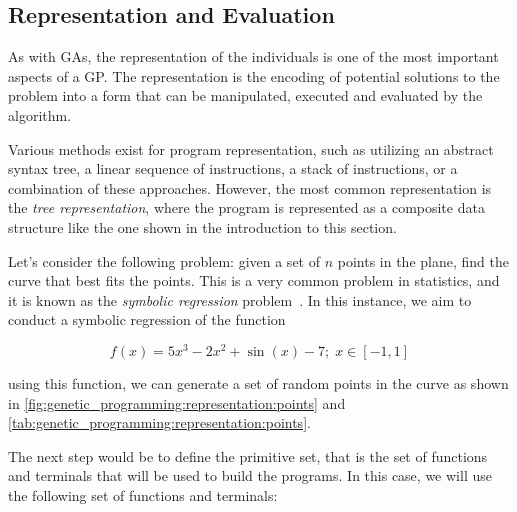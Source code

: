 \subsection{Representation and Evaluation}
\label{sec:genetic_programming:representation}
  As with GAs, the representation of the individuals is one of the most 
  important aspects of a GP.
  The representation is the encoding of potential solutions to the problem into
  a form that can be manipulated, executed and evaluated by the algorithm.

  Various methods exist for program representation, such as utilizing an abstract 
  syntax tree, a linear sequence of instructions, a stack of instructions, or a combination of these approaches.
  However, the most common representation is the \emph{tree representation}, where
  the program is represented as a composite data structure like the one shown in
  the introduction to this section.

  Let's consider the following problem: given a set of \(n\) points in the 
  plane, find the curve that best fits the points.
  This is a very common problem in statistics, and it is known as the
  \emph{symbolic regression} 
  problem~\autocite{kozaGeneticProgrammingProgramming1992a}.
  In this instance, we aim to conduct a symbolic regression of the function

  \begin{equation}
    f(x) = 5x^3 - 2x^2 + \sin(x) - 7;\; x \in [-1, 1]
  \end{equation}

  using this function, we can generate a set of random points in the curve as
  shown in \vref{fig:genetic_programming:representation:points} and 
  \vref{tab:genetic_programming:representation:points}.

  The next step would be to define the primitive set, that is the set of
  functions and terminals that will be used to build the programs.
  In this case, we will use the following set of functions and terminals:

